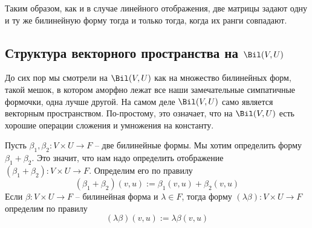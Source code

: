 Таким образом, как и в случае линейного отображения, две матрицы задают одну и ту же билинейную форму тогда и только тогда, когда их ранги совпадают.


\subsection{Структура векторного пространства на $\Bil(V,U)$}

До сих пор мы смотрели на $\Bil(V, U)$ как на множество билинейных форм, такой мешок, в котором аморфно лежат все наши замечательные симпатичные формочки, одна лучше другой.
На самом деле $\Bil(V, U)$ само является векторным пространством.
По-простому, это означает, что на $\Bil(V, U)$ есть хорошие операции сложения и умножения на константу.


\begin{definition}
Пусть $\beta_1,\beta_2\colon V\times U \to F$ -- две билинейные формы.
Мы хотим определить форму $\beta_1 + \beta_2$.
Это значит, что нам надо определить отображение $(\beta_1 + \beta_2)\colon V\times U \to F$.
Определим его по правилу
\[
(\beta_1 + \beta_2)(v, u) := \beta_1(v,u) + \beta_2(v,u)
\]
Если $\beta\colon V\times U \to F$ -- билинейная форма и $\lambda\in F$, тогда форму $(\lambda \beta)\colon V\times U \to F$ определим по правилу
\[
(\lambda\beta)(v, u) := \lambda \beta(v, u)
\]
\end{definition}

